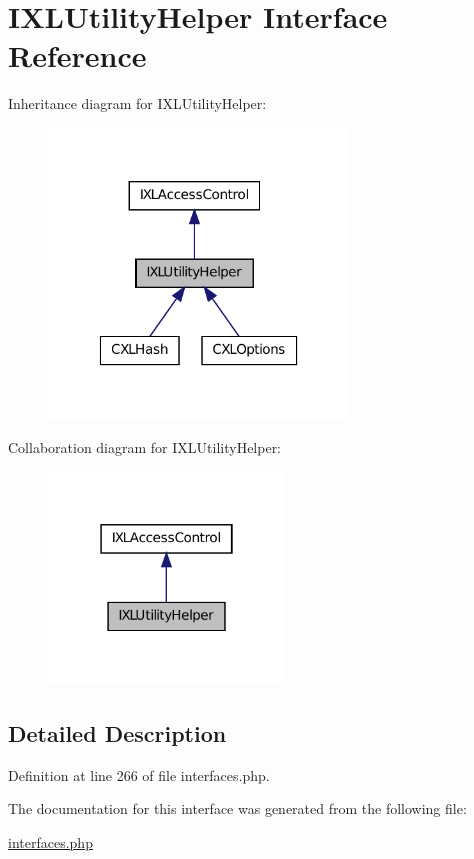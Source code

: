 \hypertarget{interfaceIXLUtilityHelper}{
\section{IXLUtilityHelper Interface Reference}
\label{interfaceIXLUtilityHelper}
}


Inheritance diagram for IXLUtilityHelper:\nopagebreak
\begin{figure}[H]
\begin{center}
\leavevmode
\includegraphics[width=226pt]{interfaceIXLUtilityHelper__inherit__graph}
\end{center}
\end{figure}


Collaboration diagram for IXLUtilityHelper:\nopagebreak
\begin{figure}[H]
\begin{center}
\leavevmode
\includegraphics[width=178pt]{interfaceIXLUtilityHelper__coll__graph}
\end{center}
\end{figure}


\subsection{Detailed Description}


Definition at line 266 of file interfaces.php.



The documentation for this interface was generated from the following file:\begin{DoxyCompactItemize}
\item 
\hyperlink{interfaces_8php}{interfaces.php}\end{DoxyCompactItemize}
